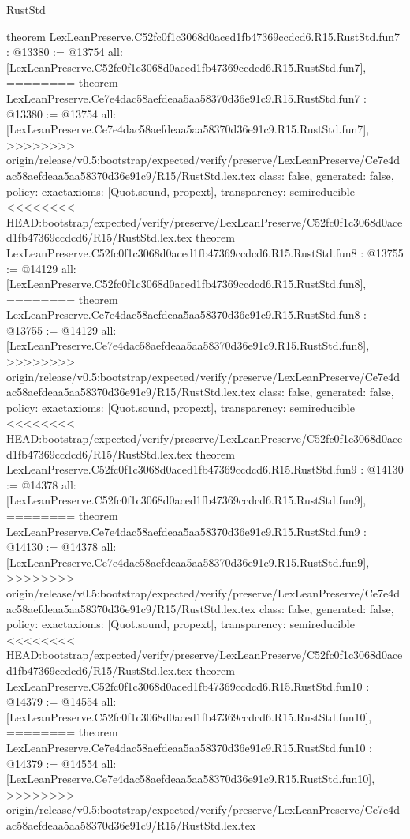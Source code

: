 \begin{lexlean}{RustStd}
\begin{coremodule}
{\begin{coremodule}
{{{{{{{{{theorem LexLeanPreserve.C52fc0f1c3068d0aced1fb47369ccdcd6.R15.RustStd.fun7 : @13380 := @13754 {
  all: [LexLeanPreserve.C52fc0f1c3068d0aced1fb47369ccdcd6.R15.RustStd.fun7],
========
theorem LexLeanPreserve.Ce7e4dac58aefdeaa5aa58370d36e91c9.R15.RustStd.fun7 : @13380 := @13754 {
  all: [LexLeanPreserve.Ce7e4dac58aefdeaa5aa58370d36e91c9.R15.RustStd.fun7],
>>>>>>>> origin/release/v0.5:bootstrap/expected/verify/preserve/LexLeanPreserve/Ce7e4dac58aefdeaa5aa58370d36e91c9/R15/RustStd.lex.tex
  class: false,
  generated: false,
  policy: exact{axioms: [Quot.sound, propext]},
  transparency: semireducible
}
<<<<<<<< HEAD:bootstrap/expected/verify/preserve/LexLeanPreserve/C52fc0f1c3068d0aced1fb47369ccdcd6/R15/RustStd.lex.tex
theorem LexLeanPreserve.C52fc0f1c3068d0aced1fb47369ccdcd6.R15.RustStd.fun8 : @13755 := @14129 {
  all: [LexLeanPreserve.C52fc0f1c3068d0aced1fb47369ccdcd6.R15.RustStd.fun8],
========
theorem LexLeanPreserve.Ce7e4dac58aefdeaa5aa58370d36e91c9.R15.RustStd.fun8 : @13755 := @14129 {
  all: [LexLeanPreserve.Ce7e4dac58aefdeaa5aa58370d36e91c9.R15.RustStd.fun8],
>>>>>>>> origin/release/v0.5:bootstrap/expected/verify/preserve/LexLeanPreserve/Ce7e4dac58aefdeaa5aa58370d36e91c9/R15/RustStd.lex.tex
  class: false,
  generated: false,
  policy: exact{axioms: [Quot.sound, propext]},
  transparency: semireducible
}
<<<<<<<< HEAD:bootstrap/expected/verify/preserve/LexLeanPreserve/C52fc0f1c3068d0aced1fb47369ccdcd6/R15/RustStd.lex.tex
theorem LexLeanPreserve.C52fc0f1c3068d0aced1fb47369ccdcd6.R15.RustStd.fun9 : @14130 := @14378 {
  all: [LexLeanPreserve.C52fc0f1c3068d0aced1fb47369ccdcd6.R15.RustStd.fun9],
========
theorem LexLeanPreserve.Ce7e4dac58aefdeaa5aa58370d36e91c9.R15.RustStd.fun9 : @14130 := @14378 {
  all: [LexLeanPreserve.Ce7e4dac58aefdeaa5aa58370d36e91c9.R15.RustStd.fun9],
>>>>>>>> origin/release/v0.5:bootstrap/expected/verify/preserve/LexLeanPreserve/Ce7e4dac58aefdeaa5aa58370d36e91c9/R15/RustStd.lex.tex
  class: false,
  generated: false,
  policy: exact{axioms: [Quot.sound, propext]},
  transparency: semireducible
}
<<<<<<<< HEAD:bootstrap/expected/verify/preserve/LexLeanPreserve/C52fc0f1c3068d0aced1fb47369ccdcd6/R15/RustStd.lex.tex
theorem LexLeanPreserve.C52fc0f1c3068d0aced1fb47369ccdcd6.R15.RustStd.fun10 : @14379 := @14554 {
  all: [LexLeanPreserve.C52fc0f1c3068d0aced1fb47369ccdcd6.R15.RustStd.fun10],
========
theorem LexLeanPreserve.Ce7e4dac58aefdeaa5aa58370d36e91c9.R15.RustStd.fun10 : @14379 := @14554 {
  all: [LexLeanPreserve.Ce7e4dac58aefdeaa5aa58370d36e91c9.R15.RustStd.fun10],
>>>>>>>> origin/release/v0.5:bootstrap/expected/verify/preserve/LexLeanPreserve/Ce7e4dac58aefdeaa5aa58370d36e91c9/R15/RustStd.lex.tex
}}}}}}}}}}}}}}
\end{coremodule}}
\end{coremodule}
\end{lexlean}

